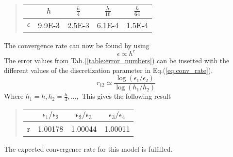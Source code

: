 \documentclass[%
twoside,                 %
final,                   %
chapterprefix=true,      %
open=right               %
10pt]{book}
\begin{document}
\begin{quote}
\begin{tabular}{ccccc}
\hline
\multicolumn{1}{c}{  } & \multicolumn{1}{c}{ $h$ } & \multicolumn{1}{c}{ $\frac{h}{4}$ } & \multicolumn{1}{c}{ $\frac{h}{16}$ } & \multicolumn{1}{c}{ $\frac{h}{64}$ } \\
\hline
$\epsilon$ & 9.9E-3 & 2.5E-3        & 6.1E-4         & 1.5E-4         \\
\hline
\end{tabular}
\end{quote}

\noindent
The convergence rate can now be found by using
\begin{equation}
    \epsilon \propto h^r
\end{equation}
The error values from Tab.(\ref{table:error_numbers}) can be inserted with the different values of the discretization parameter in Eq.(\ref{eq:conv_rate}). 
\begin{equation} \label{eq:conv_rate}
 r_{12} \simeq \frac{\log(\epsilon_1/\epsilon_2)}{\log(h_1/h_2)}
\end{equation}
Where $h_1 = h,h_2 = \frac{h}{4},...,$ This gives the following result

\begin{quote}
\begin{tabular}{cccc}
\hline
\multicolumn{1}{c}{  } & \multicolumn{1}{c}{ $\epsilon_1/\epsilon_2$ } & \multicolumn{1}{c}{ $\epsilon_2/\epsilon_3$ } & \multicolumn{1}{c}{ $\epsilon_3/\epsilon_4$ } \\
\hline
r & 1.00178                 & 1.00044                 & 1.00011                 \\
\hline
\end{tabular}
\end{quote}

\noindent
The expected convergence rate for this model is fulfilled.
\end{document}
